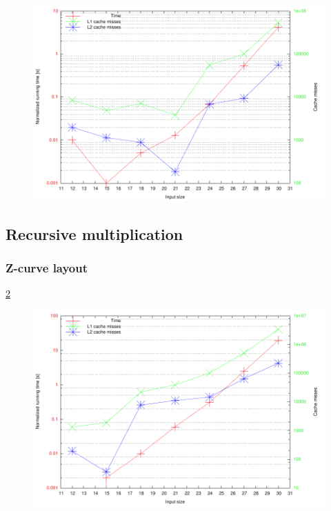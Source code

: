 \begin{figure}[h!]
  \centering
  \includegraphics[width=\textwidth]{rncnrn0.pdf}
  \label{fig:rncnrn0}
\end{figure}

\subsection{Recursive multiplication}

\subsubsection{Z-curve layout}

\ref{fig:zrzrzr0}

\begin{figure}[h!]
  \centering
  \includegraphics[width=\textwidth]{zrzrzr0.pdf}
  \label{fig:zrzrzr0}
\end{figure}

